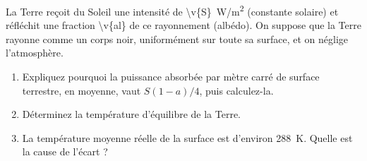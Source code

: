 La Terre reçoit du Soleil une intensité de \qty{\v{S}}{W/m^2} (constante solaire) et réfléchit une fraction \num{\v{al}} de ce rayonnement (albédo). On suppose que la Terre rayonne comme un corps noir, uniformément sur toute sa surface, et on néglige l'atmosphère.

\begin{enumerate}[label=\alph*)]
    \item Expliquez pourquoi la puissance absorbée par mètre carré de surface terrestre, en moyenne, vaut $S(1 - a)/4$, puis calculez-la.
    \item Déterminez la température d'équilibre de la Terre.
    \item La température moyenne réelle de la surface est d'environ \qty{288}{K}. Quelle est la cause de l'écart ?
\end{enumerate}
